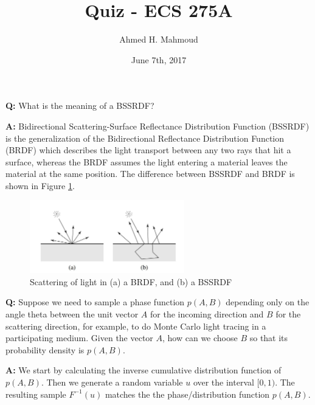 \documentclass[12pt] {article}
\begin{document}
\title{Quiz - ECS 275A}
\author{Ahmed H. Mahmoud}
\date{June 7th, 2017} 

\maketitle

\textbf{Q:} What is the meaning of a BSSRDF?

\textbf{A:} Bidirectional Scattering-Surface Reflectance Distribution Function (BSSRDF) is the generalization of the Bidirectional Reflectance Distribution Function (BRDF) which describes the light transport between any two rays that hit a surface, whereas the BRDF assumes the light entering a material leaves the material at the same position. The difference between BSSRDF and BRDF is shown in Figure \ref{fig:bssrdf}.
\newline

\begin{figure}[!tbh]
 \centering        
 \includegraphics[width=0.6\textwidth]{BSSRDF.jpg}
     \caption{Scattering of light in (a) a BRDF, and (b) a BSSRDF}
   \label{fig:bssrdf}
\end{figure} 


\textbf{Q:} Suppose we need to sample a phase function $p(A, B)$ depending only on the angle theta between the unit vector $A$ for the incoming direction and $B$ for the scattering direction, for example, to do Monte Carlo light tracing in a participating medium. Given the vector $A$, how can we choose $B$ so that its probability density is $p(A, B)$.

\textbf{A:}
We start by calculating the inverse cumulative distribution function of $p(A,B)$. Then we generate a random variable $u$ over the interval $[0,1)$. The resulting sample $F^{-1}(u)$ matches the the phase/distribution function $p(A,B)$.
\end{document}
